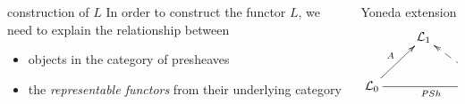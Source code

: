 \begin{frame}
\begin{columns}[t]
\begin{column}{0.5\textwidth}
\begin{block}{construction of $L$}
In order to construct the functor $L$, we need to explain the relationship between
\begin{itemize}
\item objects in the category of presheaves 
\item the {\it representable functors} from their underlying category
\end{itemize}
\end{block}
\end{column}
\begin{column}{0.5\textwidth}
\begin{block}{Yoneda extension}
$$
\xymatrix{
& \mathcal{L}_1 & \\
\mathcal{L}_0 \ar[ru]^{A} \ar[rr]_{PSh} & & \textit{Sets}^{\mathcal{L}_0^{opp}} \ar@{-->}[lu]_{L}
}
$$
\end{block}
\end{column}
\end{columns}
\end{frame}